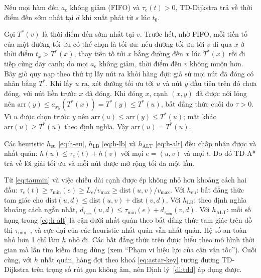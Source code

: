 \begin{dl}\label{dl:tdd}
Nếu mọi hàm đến $a_e$ không giảm (FIFO) và $\tau_e(t)>0$, TD-Dijkstra trả về thời điểm đến sớm nhất tại $d$ khi xuất phát từ
$s$ lúc $t_0$.
\end{dl}
\begin{cm}
Gọi $T^\ast(v)$ là thời điểm đến sớm nhất tại $v$. Trước hết, nhờ FIFO, mỗi tiền tố của một đường tối ưu có thể chọn là
tối ưu: nếu đường tối ưu tới $v$ đi qua $x$ ở thời điểm $t_x>T^\ast(x)$, thay tiền tố tới $x$ bằng đường đến $x$ lúc $T^\ast(x)$
rồi đi tiếp cùng dãy cạnh; do mọi $a_e$ không giảm, thời điểm đến $v$ không muộn hơn. Bây giờ quy nạp theo thứ tự lấy nút
ra khỏi hàng đợi: giả sử mọi nút đã đóng có nhãn bằng $T^\ast$. Khi lấy $u$ ra, xét đường tối ưu tới $u$ và nút $y$ đầu tiên
trên đó chưa đóng, với nút liền trước $x$ đã đóng. Khi đóng $x$, cạnh $(x,y)$ đã được nới lỏng nên
$\text{arr}(y)\le a_{xy}(T^\ast(x))=T^\ast(y)\le T^\ast(u)$, bất đẳng thức cuối do $\tau>0$. Vì $u$ được chọn trước $y$ nên
$\text{arr}(u)\le\text{arr}(y)\le T^\ast(u)$; mặt khác $\text{arr}(u)\ge T^\ast(u)$ theo định nghĩa. Vậy $\text{arr}(u)=T^\ast(u)$.
\end{cm}

\begin{md}\label{md:heur}
Các heuristic $h_{\text{eu}}$ \eqref{eq:h-eu}, $h_{\text{LB}}$ \eqref{eq:h-lb} và $h_{\text{ALT}}$ \eqref{eq:h-alt} đều chấp nhận được
và nhất quán: $h(u)\le\tau_e(t)+h(v)$ với mọi $e=(u,v)$ và mọi $t$. Do đó TD-A* trả về lời giải tối ưu và mỗi nút được mở
rộng tối đa một lần.
\end{md}
\begin{cm}
Từ \eqref{eq:taumin} và việc chiều dài cạnh được ép không nhỏ hơn khoảng cách hai đầu:
$\tau_e(t)\ge\tau_{\min}(e)\ge L_e/v_{\max}\ge \text{dist}(u,v)/v_{\max}$. Với $h_{\text{eu}}$: bất đẳng thức tam giác cho
$\text{dist}(u,d)\le\text{dist}(u,v)+\text{dist}(v,d)$. Với $h_{\text{LB}}$: theo định nghĩa khoảng cách ngắn nhất,
$d_{\tau_{\min}}(u,d)\le\tau_{\min}(e)+d_{\tau_{\min}}(v,d)$. Với $h_{\text{ALT}}$: mỗi số hạng trong \eqref{eq:h-alt} là cận dưới
nhất quán theo bất đẳng thức tam giác trên đồ thị $\tau_{\min}$~\cite{goldberg2005alt}, và cực đại của các heuristic nhất
quán vẫn nhất quán. Hệ số an toàn nhỏ hơn 1 chỉ làm $h$ nhỏ đi. Các bất đẳng thức trên được hiểu theo mô hình thời gian mà
lần tìm kiếm đang dùng (xem ``Phạm vi hiệu lực của cận vận tốc''). Cuối cùng, với $h$ nhất quán, hàng đợi theo khoá
\eqref{eq:astar-key} tương đương TD-Dijkstra trên trọng số rút gọn không âm, nên Định lý~\ref{dl:tdd} áp dụng được.
\end{cm}

